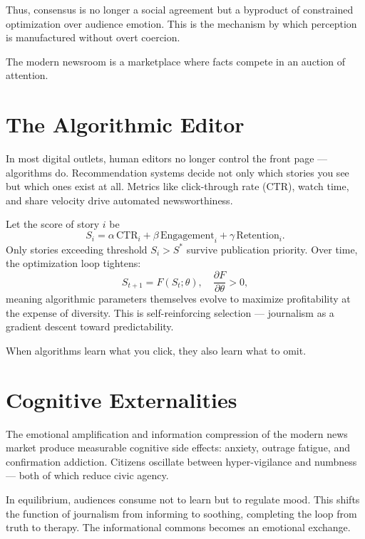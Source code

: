 \documentclass[12pt,twoside]{book}
\begin{document}
Thus, consensus is no longer a social agreement but a byproduct of constrained optimization over audience emotion.  
This is the mechanism by which perception is manufactured without overt coercion. \\

\begin{keyidea}
The modern newsroom is a marketplace where facts compete in an auction of attention.
\end{keyidea}

\section{The Algorithmic Editor}

In most digital outlets, human editors no longer control the front page --- algorithms do.  
Recommendation systems decide not only which stories you see but which ones exist at all.  
Metrics like click-through rate (CTR), watch time, and share velocity drive automated newsworthiness.  

Let the score of story \(i\) be
\[
S_i = \alpha \,\text{CTR}_i + \beta\, \text{Engagement}_i + \gamma\, \text{Retention}_i.
\]
Only stories exceeding threshold \(S_i > S^*\) survive publication priority.  
Over time, the optimization loop tightens:  
\[
S_{t+1} = F(S_t; \theta), \quad \frac{\partial F}{\partial \theta} > 0,
\]
meaning algorithmic parameters themselves evolve to maximize profitability at the expense of diversity.  
This is self-reinforcing selection --- journalism as a gradient descent toward predictability.\\

\begin{keyidea}
When algorithms learn what you click, they also learn what to omit.
\end{keyidea}

\section{Cognitive Externalities}

The emotional amplification and information compression of the modern news market produce measurable cognitive side effects: anxiety, outrage fatigue, and confirmation addiction.  
Citizens oscillate between hyper-vigilance and numbness --- both of which reduce civic agency.  

In equilibrium, audiences consume not to learn but to regulate mood.  
This shifts the function of journalism from informing to soothing, completing the loop from truth to therapy.  
The informational commons becomes an emotional exchange.\\
\end{document}
